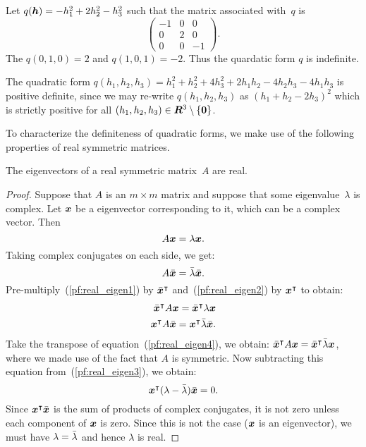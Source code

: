 \begin{example}
Let $q(\boldsymbol{h}) = -h_1^2 + 2h_2^2 - h_3^2$ such that the matrix associated with~$q$ is
\[
	\begin{pmatrix}
	-1 & 0 & 0 \\
	0  & 2 & 0 \\
    0  & 0 & -1
	\end{pmatrix}.
\]
The $q(0, 1, 0) = 2$ and $q(1, 0, 1) = -2$. Thus the quardatic form $q$ is indefinite.
\end{example}

\begin{example}
The quadratic form $q(h_1, h_2, h_3) = h_1^2 + h_2^2 + 4h_3^2 + 2h_1h_2 - 4h_2h_3 - 4h_1 h_3$
is positive definite, since we may re-write $q(h_1, h_2, h_3)$ as $(h_1 + h_2 - 2h_3)^2$
which is strictly positive for all $(h_1, h_2, h_3) \in \bm{R}^3 \setminus \{\boldsymbol{0}\}$.
\end{example}
To characterize the definiteness of quadratic forms, we make use of the following
properties of real symmetric matrices.
\begin{lemma}
The eigenvectors of a real symmetric matrix~$A$ are real.
\end{lemma}
\begin{proof}
Suppose that $A$ is an $m \times m$ matrix and suppose that some eigenvalue~$\lambda$
is complex. Let $\boldsymbol{x}$ be a eigenvector corresponding to it, which can be a complex
vector. Then
\begin{equation}\label{pf:real_eigen1}
	A \boldsymbol{x} =  \lambda \boldsymbol{x}.
\end{equation}
Taking complex conjugates on each side, we get:
\begin{equation}\label{pf:real_eigen2}
	A \bar{\boldsymbol{x}} =  \bar{\lambda} \bar{\boldsymbol{x}}.
\end{equation}
Pre-multiply~(\ref{pf:real_eigen1})  by $\bar{\boldsymbol{x}}^{\intercal}$
and~(\ref{pf:real_eigen2}) by $\boldsymbol{x}^{\intercal}$
to obtain:
\begin{eqnarray}
	\bar{\boldsymbol{x}}^{\intercal} A \boldsymbol{x} =  \bar{\boldsymbol{x}}^{\intercal} \lambda \boldsymbol{x} \label{pf:real_eigen3}\\
	\boldsymbol{x} ^{\intercal}A \bar{\boldsymbol{x}} =  \boldsymbol{x}^{\intercal} \bar{\lambda} \bar{\boldsymbol{x}} \label{pf:real_eigen4}.
\end{eqnarray}
Take the transpose of equation~(\ref{pf:real_eigen4}), we obtain:
$\bar{\boldsymbol{x}}^{\intercal} A \boldsymbol{x} =  \bar{\boldsymbol{x}}^{\intercal} \bar{\lambda} \boldsymbol{x}$,
where we made use of the fact that $A$ is symmetric. Now subtracting this equation from~(\ref{pf:real_eigen3}),
we obtain:
\[
\boldsymbol{x}^{\intercal} (\lambda - \bar{\lambda}) \bar{\boldsymbol{x}} = 0.
\]
Since $\boldsymbol{x}^{\intercal} \bar{\boldsymbol{x}}$ is the sum of products of complex conjugates,
it is not zero unless each component of $\boldsymbol{x}$ is zero. Since this is not the case
($\boldsymbol{x}$ is an eigenvector), we must have $\lambda = \bar{\lambda}$ and hence $\lambda$
is real.
\end{proof}

